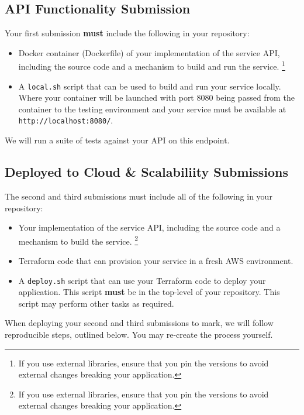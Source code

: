 \documentclass{csse4400}
\begin{document}
\begin{samepage}
\subsection{API Functionality Submission}
Your first submission \textbf{must} include the following in your repository:
\begin{itemize}
  \item Docker container (Dockerfile) of your implementation of the service API, including the source code and a mechanism to build and run the service.%
  \footnote{If you use external libraries, ensure that you pin the versions to avoid external changes breaking your application.}
  \item A \texttt{local.sh} script that can be used to build and run your service locally. Where your container will be launched with port 8080 being passed from the container to the testing environment and your service must be available at \texttt{http://localhost:8080/}.
\end{itemize}
We will run a suite of tests against your API on this endpoint.
\end{samepage}

\begin{samepage}
\subsection{Deployed to Cloud \& Scalabiliity Submissions}
The second and third submissions must include all of the following in your repository:
\begin{itemize}
  \item Your implementation of the service API, including the source code and a mechanism to build the service.%
  \footnote{If you use external libraries, ensure that you pin the versions to avoid external changes breaking your application.}
  \item Terraform code that can provision your service in a fresh AWS environment.
  \item A \texttt{deploy.sh} script that can use your Terraform code to deploy your application. This script \textbf{must} be in the top-level of your repository. This script may perform other tasks as required.
\end{itemize}
\end{samepage}

\noindent
When deploying your second and third submissions to mark, we will follow reproducible steps, outlined below.
You may re-create the process yourself.
\end{document}
